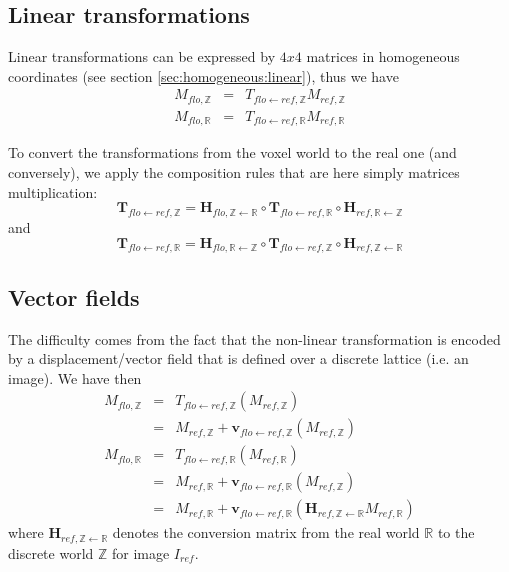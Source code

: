 \subsection{Linear transformations}

Linear transformations can be expressed by $4x4$ matrices in homogeneous coordinates (see section \ref{sec:homogeneous:linear}), thus we have 
\begin{eqnarray*}
M_{flo,\mathbb{Z}} & = & 
T_{flo \leftarrow ref,\mathbb{Z}} M_{ref,\mathbb{Z}}  \\
M_{flo,\mathbb{R}} & = & 
T_{flo \leftarrow ref,\mathbb{R}} M_{ref,\mathbb{R}}
\end{eqnarray*}

To convert the transformations from the voxel world to the real one (and conversely), we apply the composition rules that are here simply matrices multiplication:
$$
\mathbf{T}_{flo \leftarrow ref, \mathbb{Z}} 
=
\mathbf{H}_{flo,\mathbb{Z} \leftarrow \mathbb{R}} \circ
\mathbf{T}_{flo \leftarrow ref, \mathbb{R}} \circ
\mathbf{H}_{ref,\mathbb{R} \leftarrow \mathbb{Z}}
$$
and
$$
\mathbf{T}_{flo \leftarrow ref, \mathbb{R}} 
=
\mathbf{H}_{flo,\mathbb{R} \leftarrow \mathbb{Z}} \circ
\mathbf{T}_{flo \leftarrow ref, \mathbb{Z}} \circ
\mathbf{H}_{ref,\mathbb{Z} \leftarrow \mathbb{R}}
$$


\subsection{Vector fields}

The difficulty comes from the fact that the non-linear transformation is encoded by a displacement/vector field that is defined over a discrete lattice (i.e. an image). We have then
\begin{eqnarray*}
M_{flo,\mathbb{Z}} & = & 
T_{flo \leftarrow ref,\mathbb{Z}}(M_{ref,\mathbb{Z}}) \\
& = &
M_{ref,\mathbb{Z}} + 
\mathbf{v}_{flo \leftarrow ref, \mathbb{Z}}(M_{ref, \mathbb{Z}}) \\
M_{flo,\mathbb{R}} & = & 
T_{flo \leftarrow ref,\mathbb{R}}(M_{ref,\mathbb{R}}) \\
& = &
M_{ref,\mathbb{R}} + 
\mathbf{v}_{flo \leftarrow ref, \mathbb{R}}(M_{ref, \mathbb{Z}}) \\
& = &
M_{ref,\mathbb{R}} + 
\mathbf{v}_{flo \leftarrow ref, \mathbb{R}}(\mathbf{H}_{ref, \mathbb{Z} \leftarrow \mathbb{R}}  M_{ref, \mathbb{R}})
\end{eqnarray*}
where $\mathbf{H}_{ref, \mathbb{Z} \leftarrow \mathbb{R}}$ denotes the conversion matrix from the real world $\mathbb{R}$ to the discrete world $\mathbb{Z}$ for image $I_{ref}$.

